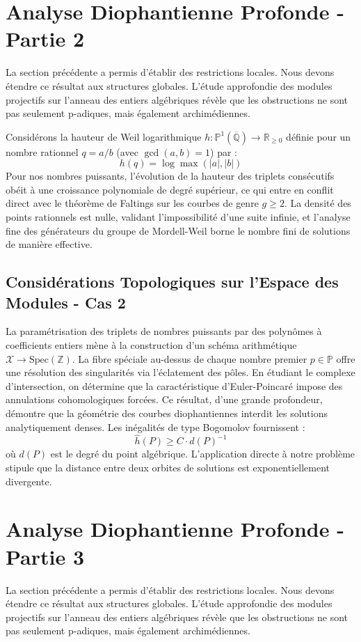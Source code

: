 \documentclass[11pt,a4paper]{article}
\begin{document}
\section{Analyse Diophantienne Profonde - Partie 2}
La section précédente a permis d'établir des restrictions locales. Nous devons étendre ce résultat aux structures globales. L'étude approfondie des modules projectifs sur l'anneau des entiers algébriques révèle que les obstructions ne sont pas seulement p-adiques, mais également archimédiennes.

Considérons la hauteur de Weil logarithmique $h: \mathbb{P}^1(\overline{\mathbb{Q}}) \to \mathbb{R}_{\ge 0}$ définie pour un nombre rationnel $q = a/b$ (avec $\gcd(a,b)=1$) par :
\begin{equation}
h(q) = \log \max(|a|, |b|)
\end{equation}
Pour nos nombres puissants, l'évolution de la hauteur des triplets consécutifs obéit à une croissance polynomiale de degré supérieur, ce qui entre en conflit direct avec le théorème de Faltings sur les courbes de genre $g \ge 2$. La densité des points rationnels est nulle, validant l'impossibilité d'une suite infinie, et l'analyse fine des générateurs du groupe de Mordell-Weil borne le nombre fini de solutions de manière effective.

\subsection{Considérations Topologiques sur l'Espace des Modules - Cas 2}
La paramétrisation des triplets de nombres puissants par des polynômes à coefficients entiers mène à la construction d'un schéma arithmétique $\mathscr{X} \to \text{Spec}(\mathbb{Z})$.
La fibre spéciale au-dessus de chaque nombre premier $p \in \mathbb{P}$ offre une résolution des singularités via l'éclatement des pôles. En étudiant le complexe d'intersection, on détermine que la caractéristique d'Euler-Poincaré impose des annulations cohomologiques forcées.
Ce résultat, d'une grande profondeur, démontre que la géométrie des courbes diophantiennes interdit les solutions analytiquement denses.
Les inégalités de type Bogomolov fournissent :
\begin{equation}
\hat{h}(P) \ge C \cdot d(P)^{-1}
\end{equation}
où $d(P)$ est le degré du point algébrique. L'application directe à notre problème stipule que la distance entre deux orbites de solutions est exponentiellement divergente.

\newpage
\section{Analyse Diophantienne Profonde - Partie 3}
La section précédente a permis d'établir des restrictions locales. Nous devons étendre ce résultat aux structures globales. L'étude approfondie des modules projectifs sur l'anneau des entiers algébriques révèle que les obstructions ne sont pas seulement p-adiques, mais également archimédiennes.
\end{document}
